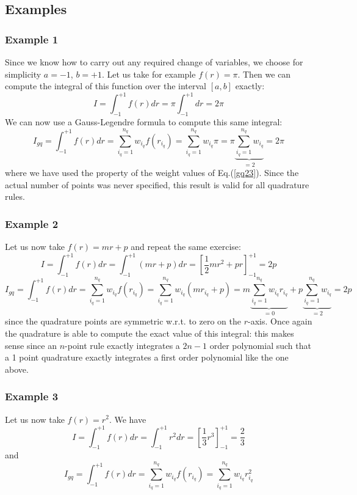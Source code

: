 \subsection{Examples}\label{ss:quad:examples}

\subsubsection{Example 1}

Since we know how to carry out any required change of variables, we choose for simplicity 
$a=-1$, $b=+1$.
Let us take for example $f(r)=\pi$. Then we can compute the integral of this function 
over the interval $[a,b]$ exactly:
\[
I=\int_{-1}^{+1} f(r) dr = \pi \int_{-1}^{+1}dr  = 2 \pi
\]
We can now use a Gauss-Legendre formula to compute this same integral:
\[
I_{gq}=\int_{-1}^{+1} f(r) dr
= \sum_{i_q=1}^{n_q} w_{i_q} f(r_{i_q}) 
= \sum_{i_q=1}^{n_q} w_{i_q} \pi
= \pi \underbrace{\sum_{i_q=1}^{n_q} w_{i_q} }_{=2}
= 2 \pi
\]
where we have used the property of the weight values of Eq.(\ref{gq23}).
Since the actual number of points was never specified, this result is valid for all 
quadrature rules.


\subsubsection{Example 2}

Let us now take $f(r)=m r+ p$ and repeat the same exercise:
\[
I=\int_{-1}^{+1} f(r) dr = \int_{-1}^{+1} (mr+p) dr  =  [\frac{1}{2} m r^2 + p r ]_{-1}^{+1} =2p
\]
\[
I_{gq}=\int_{-1}^{+1} f(r) dr
\!= \sum_{i_q=1}^{n_q} w_{i_q} f(r_{i_q}) 
\!= \sum_{i_q=1}^{n_q} w_{i_q} (m r_{i_q} + p)  
\!= m \underbrace{\sum_{i_q=1}^{n_q} w_{i_q} r_{i_q}}_{=0}  + p \underbrace{\sum_{i_q=1}^{n_q} w_{i_q}}_{=2}  = 2p
\]
since the quadrature points are symmetric w.r.t. to zero on the $r$-axis.
Once again the quadrature is able to compute the exact value of this integral: this makes sense since 
an $n$-point rule exactly integrates a $2n-1$ order polynomial such that a 1 point quadrature exactly 
integrates a first order polynomial like the one above.



\subsubsection{Example 3}

Let us now take $f(r)=r^2$. We have 
\[
I=\int_{-1}^{+1} f(r) dr = \int_{-1}^{+1} r^2 dr  =  \left[\frac{1}{3}r^3 \right]_{-1}^{+1} =  \frac{2}{3} 
\]
and 
\[
I_{gq}=\int_{-1}^{+1} f(r) dr 
\!= \sum_{i_q=1}^{n_q} w_{i_q} f(r_{i_q}) 
\!= \sum_{i_q=1}^{n_q} w_{i_q} r_{i_q}^2 
\]

